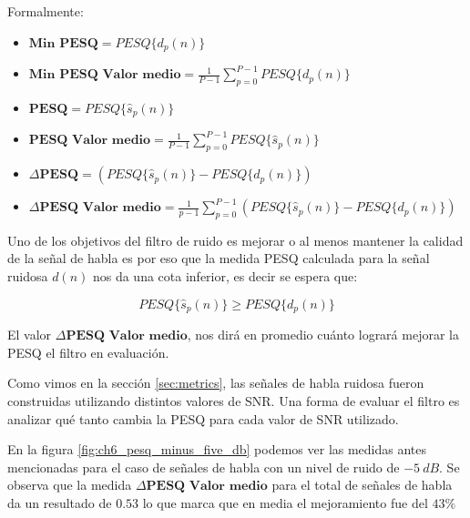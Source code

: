 Formalmente:

\begin{itemize}
	\item $\textbf{Min PESQ} = PESQ\{ d_p(n) \}$
	\item $\textbf{Min PESQ Valor medio} = \frac{1}{P-1} \sum_{p=0}^{P-1} PESQ\{ d_p(n) \}$
	\item $\textbf{PESQ} = PESQ\{ \hat{s}_p(n) \}$
	\item $\textbf{PESQ Valor medio} = \frac{1}{P-1} \sum_{p=0}^{P-1} PESQ\{ \hat{s}_p(n) \}$
	\item $\Delta \textbf{PESQ} = \left( PESQ\{ \hat{s}_p(n) \} - PESQ\{ d_p(n) \} \right)$
	\item $\Delta \textbf{PESQ Valor medio} = \frac{1}{p-1} \sum_{p=0}^{P-1} \left( PESQ\{ \hat{s}_p(n) \} - PESQ\{ d_p(n) \} \right)$
\end{itemize}

Uno de los objetivos del filtro de ruido es mejorar o al menos mantener la calidad de la señal de habla es por eso que la medida PESQ calculada para la señal ruidosa $d(n)$ nos da una cota inferior, es decir se espera que:

\begin{equation*}
	PESQ\{ \hat{s}_p(n) \} \geq PESQ\{ d_p(n) \}
\end{equation*}

El valor $\Delta \textbf{PESQ Valor medio}$, nos dirá en promedio cuánto logrará mejorar la PESQ el filtro en evaluación.

Como vimos en la sección \ref{sec:metrics}, las señales de habla ruidosa fueron construidas utilizando distintos valores de SNR. Una forma de evaluar el filtro es analizar qué tanto cambia la PESQ para cada valor de SNR utilizado.

En la figura \ref{fig:ch6_pesq_minus_five_db} podemos ver las medidas antes mencionadas para el caso de señales de habla con un nivel de ruido de $\SI{-5}{dB}$. Se observa que la medida $\Delta \textbf{PESQ Valor medio}$ para el total de señales de habla da un resultado de $0.53$ lo que marca que en media el mejoramiento fue del $43\%$


